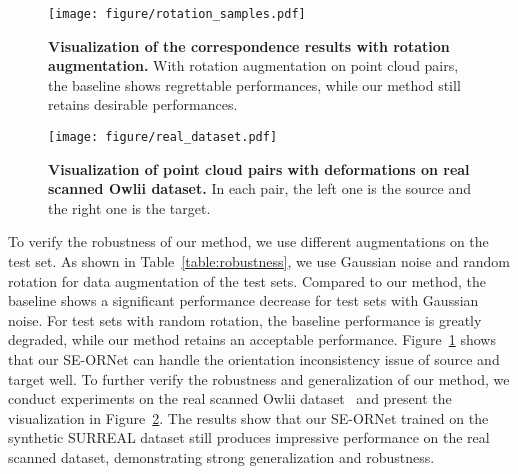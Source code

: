 \begin{figure}[!t]
  \begin{center}
    \vspace{-1.8em}
      \texttt{[image: figure/rotation\_samples.pdf]}
      \vspace{-0.8em}
      \caption{\textbf{Visualization of the correspondence results with rotation augmentation. }
With rotation augmentation on point cloud pairs, the baseline shows regrettable performances, while our method still retains desirable performances.
      }
      \vspace{-1.8em}
      \label{rotation_samples}
  \end{center}
\end{figure}

\begin{figure}[!t]
  \begin{center}
      \texttt{[image: figure/real\_dataset.pdf]}
      \vspace{-1.8em}
      \caption{\textbf{Visualization of point cloud pairs with deformations on real scanned Owlii dataset.}
In each pair, the left one is the source and the right one is the target.
      }
      \vspace{-2.5em}
      \label{real_dataset}
  \end{center}
\end{figure}

To verify the robustness of our method, we use different augmentations on the test set. As shown in Table~\ref{table:robustness}, we use Gaussian noise and random rotation for data augmentation of the test sets. 
Compared to our method, the baseline shows a significant performance decrease for test sets with Gaussian noise.
For test sets with random rotation, the baseline performance is greatly degraded, while our method retains an acceptable performance.
Figure~\ref{rotation_samples} shows that our SE-ORNet can handle the orientation inconsistency issue of source and target well.
To further verify the robustness and generalization of our method, we conduct experiments on the real scanned Owlii dataset~\cite{xu2017owlii} and present the visualization in Figure~\ref{real_dataset}.
The results show that our SE-ORNet trained on the synthetic SURREAL dataset still produces impressive performance on the real scanned dataset, demonstrating strong generalization and robustness. 




